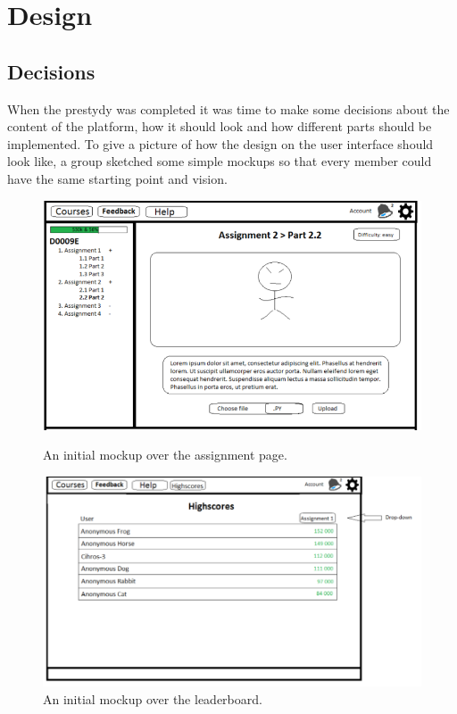 \chapter{Design}
\section{Decisions} 
When the prestydy was completed it was time to make some decisions about the content of the platform, how it should look and how different parts should be implemented. To give a picture of how the design on the user interface should look like, a group sketched some simple mockups
so that every member could have the same starting point and vision. 

\begin{figure}[H]
  \centering
  \begin{minipage}[b]{0.7\textwidth}
    \includegraphics[width=\textwidth]{img/mockup1.png}
    \caption{An initial mockup over the assignment page.}
  \end{minipage}
  \hfill
  \begin{minipage}[b]{0.7\textwidth}
    \includegraphics[width=\textwidth]{img/mockup2.png}
    \caption{An initial mockup over the leaderboard.}
  \end{minipage}
\end{figure}

